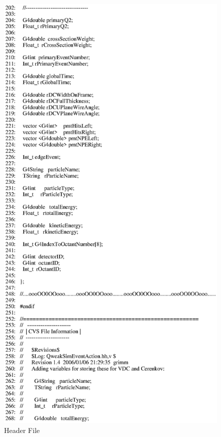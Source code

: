 \clearpage

\begin{figure}[h]
  \hspace{0cm}
  \includegraphics[scale=0.8]{./figures13/QweakSimEventAction.hh-p4.eps}
  \caption{Header File}
           \label{fig:XIII-SC-14}
\end{figure}

